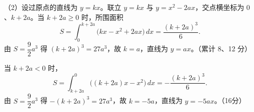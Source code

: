 \begin{answer}
（2）设过原点的直线为 $y=kx$。联立 $y=kx$ 与 $y=x^2-2ax$，交点横坐标为 $0$、$k+2a$。当 $k+2a\ge0$ 时，所围面积
\nopagebreak[4]
\[S=\int_0^{k+2a}\bigl(kx-x^2+2ax\bigr)\,dx=\frac{(k+2a)^3}{6}.\]
由 $S=\dfrac92a^3$ 得 $(k+2a)^3=27a^3$，故 $k=a$，直线为 $y=ax$。（累计 8、12 分）

当 $k+2a<0$ 时，
\nopagebreak[4]
\[S=\int_{k+2a}^{0}\bigl((k+2a)x-x^2\bigr)\,dx=-\frac{(k+2a)^3}{6}.\]
由 $S=\dfrac92a^3$ 得 $-(k+2a)^3=27a^3$，故 $k=-5a$，直线为 $y=-5ax$。（16分）

\gkanswer{答案：$A_2$ 组（1）$(z_1,z_2)=\left(-\dfrac12+\dfrac{\sqrt3}{2}i,\ -\dfrac12-\dfrac{\sqrt3}{2}i\right)$ 或互换；（2）$|\omega|\in[\sqrt{13},4)$。$B_2$ 组（1）$V=\dfrac{\pi a^5}{3}$；（2）$y=ax$ 或 $y=-5ax$。}

\end{answer}
